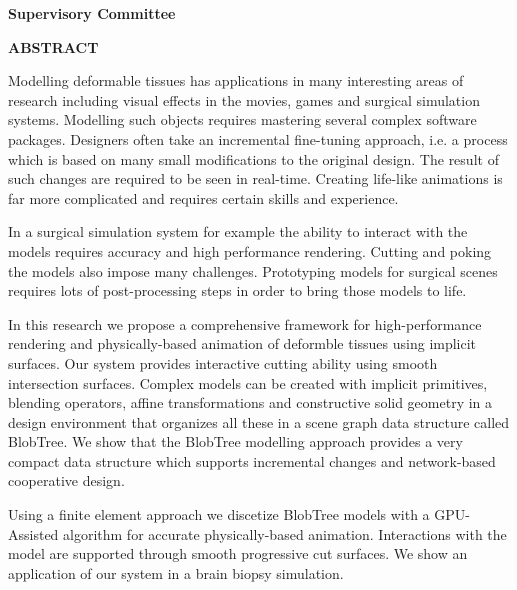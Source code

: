 \newpage
{}

\noindent \textbf{Supervisory Committee}
\tpbreak
\panel

\begin{center}
\textbf{ABSTRACT}
\end{center}
Modelling deformable tissues has applications in many interesting areas of research including visual effects in the movies, games and
surgical simulation systems. Modelling such objects requires mastering several complex software packages.  Designers often take an incremental 
fine-tuning approach, i.e. a process which is based on many small modifications to the original design. The result of such 
changes are required to be seen in real-time. Creating life-like animations is far more complicated and requires certain skills and experience. 

In a surgical simulation system for example the ability to interact with the models requires accuracy and high performance rendering. 
Cutting and poking the models also impose many challenges. Prototyping models for surgical scenes requires lots of post-processing steps 
in order to bring those models to life.

In this research we propose a comprehensive framework for high-performance rendering and physically-based animation of deformble tissues
using implicit surfaces. Our system provides interactive cutting ability using smooth intersection surfaces. 
Complex models can be created with implicit primitives, blending operators, affine transformations and constructive solid geometry 
in a design environment that organizes all these in a scene graph data structure called BlobTree. We show that the BlobTree modelling approach
provides a very compact data structure which supports incremental changes and network-based cooperative design. 

Using a finite element approach we discetize BlobTree models with a GPU-Assisted algorithm for accurate physically-based animation. Interactions with the
model are supported through smooth progressive cut surfaces. We show an application of our system in a brain biopsy simulation.



